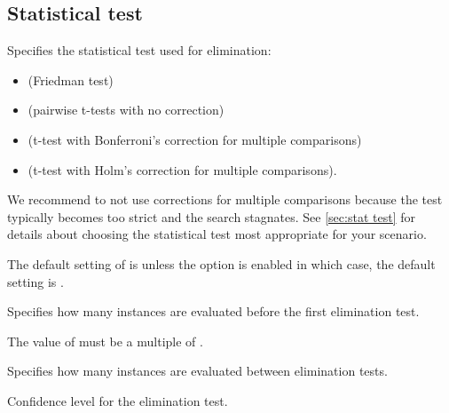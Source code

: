 \subsection[Statistical test]{Statistical test}
\begin{description}
Specifies the statistical test used for elimination:
\begin{itemize}
\item[]  (Friedman test)
\item[]  (pairwise t-tests with no correction)
\item[]  (t-test with Bonferroni's correction for multiple comparisons)
\item[]  (t-test with Holm's correction for multiple comparisons).
\end{itemize}
 We recommend to not use corrections for multiple comparisons because the test typically becomes too strict and the search stagnates. 
See \autoref{sec:stat test} for details about choosing the statistical test most appropriate for your scenario.
\begin{xwarningbox}
 The default setting of  is  unless the  option is enabled in which case, the default setting is .
\end{xwarningbox}

 Specifies how many instances are evaluated before the first elimination test.
\begin{xwarningbox}
The value of  must be a multiple of .
\end{xwarningbox}

Specifies how many instances are evaluated between elimination tests.

Confidence level for the elimination test.

\end{description}


